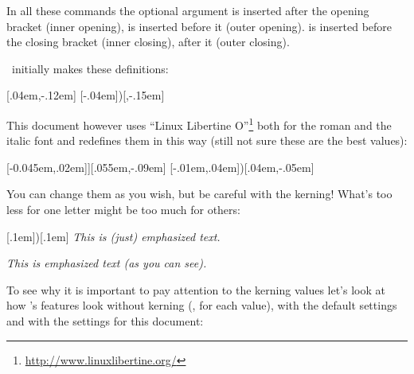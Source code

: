 \documentclass[load-preamble+]{cnltx-doc}
\begin{document}
In all these commands the optional argument  is inserted after
the opening bracket (inner opening),  is inserted before it
(outer opening).  is inserted before the closing bracket (inner
closing),  after it (outer closing).

\embrac\ initially makes these definitions:
\begin{sourcecode}
  \AddEmph{[}{]}[.04em,-.12em]
  \AddEmph{(}[-.04em]{)}[,-.15em]
\end{sourcecode}

This document however uses ``Linux Libertine
O''\footnote{\url{http://www.linuxlibertine.org/}} both for the roman and the
italic font and redefines them in this way (still not sure these are the best
values):
\begin{sourcecode}
  \RenewEmph{[}[-0.045em,.02em]{]}[.055em,-.09em]
  \ChangeEmph{(}[-.01em,.04em]{)}[.04em,-.05em]
\end{sourcecode}

You can change them as you wish, but be careful with the kerning! What's too
less for one letter might be too much for others:
\begin{example}
  \ChangeEmph{(}[.1em]{)}[.1em]
  \emph{This is (just) emphasized text.} \par %
  \emph{This is emphasized text (as you can see).} %
\end{example}

To see why it is important to pay attention to the kerning values let's look
at how \embrac's features look without kerning (\ie, \code{0pt} for each
value), with the default settings and with the settings for this document:
\end{document}
